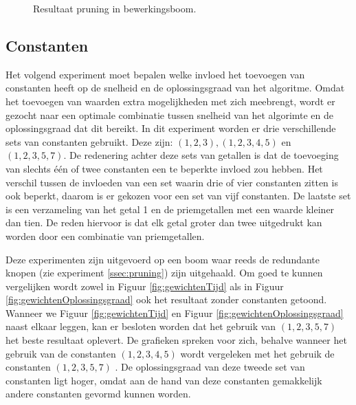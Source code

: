 \documentclass[Main.tex]{subfiles}
\begin{document}
\begin{figure}[!htb]
\centering
{}
\caption{Resultaat pruning in bewerkingsboom.} \label{fig:pruningInBewerkingsboom}
\end{figure}

\subsection{Constanten} \label{ssec:constanten}
Het volgend experiment moet bepalen welke invloed het toevoegen van constanten heeft op de snelheid en de oplossingsgraad van het algoritme. Omdat het toevoegen van waarden extra mogelijkheden met zich meebrengt, wordt er gezocht naar een optimale combinatie tussen snelheid van het algorimte en de oplossingsgraad dat dit bereikt. In dit experiment worden er drie verschillende sets van constanten gebruikt. Deze zijn: $(1,2,3), (1,2,3,4,5)$ en $(1,2,3,5,7)$. De redenering achter deze sets van getallen is dat de toevoeging van slechts \'e\'en of twee constanten een te beperkte invloed zou hebben. Het verschil tussen de invloeden van een set waarin drie of vier constanten zitten is ook beperkt, daarom is er gekozen voor een set van vijf constanten. De laatste set is een verzameling van het getal 1 en de priemgetallen met een waarde kleiner dan tien. De reden hiervoor is dat elk getal groter dan twee uitgedrukt kan worden door een combinatie van priemgetallen.
\par Deze experimenten zijn uitgevoerd op een boom waar reeds de redundante knopen (zie experiment \ref{ssec:pruning}) zijn uitgehaald. Om goed te kunnen vergelijken wordt zowel in Figuur \ref{fig:gewichtenTijd} als in Figuur \ref{fig:gewichtenOplossingsgraad} ook het resultaat zonder constanten getoond. Wanneer we Figuur \ref{fig:gewichtenTijd} en Figuur \ref{fig:gewichtenOplossingsgraad} naast elkaar leggen, kan er besloten worden dat het gebruik van $(1,2,3,5,7)$ het beste resultaat oplevert. De grafieken spreken voor zich, behalve wanneer het gebruik van de constanten $(1, 2, 3, 4, 5)$  wordt vergeleken met het gebruik de constanten $(1, 2, 3, 5, 7)$ . De oplossingsgraad van deze tweede set van constanten ligt hoger, omdat aan de hand van deze constanten gemakkelijk andere constanten gevormd kunnen worden. 
\end{document}
